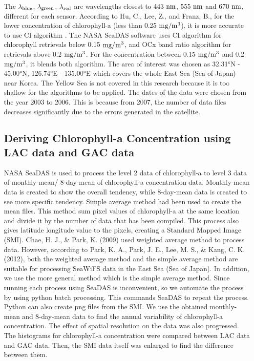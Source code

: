 The $\rm {\lambda}_{blue}$, $\rm {\lambda}_{green}$, $\rm {\lambda}_{red}$ are wavelengths closest to 443 $\rm nm$, 555 $\rm nm$ and 670 $\rm nm$, different for each sensor. According to Hu, C., Lee, Z., and Franz, B., for the lower concentration of chlorophyll-a (less than 0.25 $\rm mg/m^3$), it is more accurate to use CI algorithm \cite{hu2012chlorophyll}. The NASA SeaDAS software uses CI algorithm for chlorophyll retrievals below 0.15 $\rm mg/m^3$, and OCx band ratio algorithm for retrievals above 0.2 $\rm mg/m^3$. For the concentration between 0.15 $\rm mg/m^3$ and 0.2 $\rm mg/m^3$, it blends both algorithm.
The area of interest was chosen as 32.31°N - 45.00°N, 126.74°E - 135.00°E which covers the whole East Sea (Sea of Japan) near Korea. The Yellow Sea is not covered in this research because it is too shallow for the algorithms to be applied. The dates of the data were chosen from the year 2003 to 2006. This is because from 2007, the number of data files decreases significantly due to the errors generated in the satellite. 


 \subsection{Deriving Chlorophyll-a Concentration using LAC data and GAC data}
 
  NASA SeaDAS is used to process the level 2 data of chlorophyll-a to level 3 data of monthly-mean/ 8-day-mean of chlorophyll-a concentration data. Monthly-mean data is created to show the overall tendency, while 8-day-mean data is created to see more specific tendency. Simple average method had been used to create the mean files. This method sum pixel values of chlorophyll-a at the same location and divide it by the number of data that has been compiled. This process also gives latitude longitude value to the pixels, creating a Standard Mapped Image (SMI). Chae, H. J., \& Park, K. (2009) used weighted average method to process data. However, according to Park, K. A., Park, J. E., Lee, M. S., \& Kang, C. K. (2012), both the weighted average method and the simple average method are suitable for processing SeaWiFS data in the East Sea (Sea of Japan). In addition, we use the more general method which is the simple average method.
 Since running each process using SeaDAS is inconvenient, so we automate the process by using python batch processing. This commands SeaDAS to repeat the process. Python can also create png files from the SMI. We use the obtained monthly-mean and 8-day-mean data to find the annual variability of chlorophyll-a concentration.
 The effect of spatial resolution on the data was also progressed. The histograms for chlorophyll-a concentration were compared between LAC data and GAC data. Then, the SMI data itself was enlarged to find the difference between them.
 
 
 